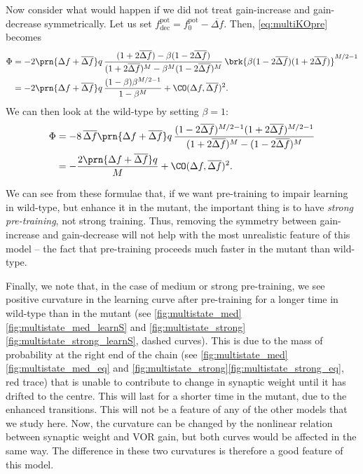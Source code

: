 \documentclass[12pt]{article}
\newcommand{\pot}{^{\text{pot}}}
\newcommand{\norm}{_0}
\newcommand{\dec}{_{\text{dec}}}
\begin{document}
Now consider what would happen if we did not treat gain-increase and gain-decrease symmetrically.
Let us set $f\pot\dec = f\pot\norm - \overline{\Delta f}$.
Then, \eqref{eq:multiKOpre} becomes
%
\begin{equation}\label{eq:multiKOdiffpre}
\begin{aligned}
  \Phi &= -2\prn{\Delta f + \overline{\Delta f}} q \, \frac{(1+2\overline{\Delta f}) - \beta(1-2\overline{\Delta f})}
          {(1+2\overline{\Delta f})^M - \beta^M(1-2\overline{\Delta f})^M}   \,
          \brk{\beta (1-2\overline{\Delta f}) (1+2\overline{\Delta f})}^{M/2-1} \\
       &= -2\prn{\Delta f + \overline{\Delta f}} q\,\frac{(1-\beta)\beta^{M/2-1}}{1-\beta^M} + \CO(\Delta f,\overline{\Delta f})^2.
\end{aligned}
\end{equation}
%
We can then look at the wild-type by setting $\beta=1$:
%
\begin{equation}\label{eq:multiWTdiffpre}
\begin{aligned}
  \Phi &= -8\,\overline{\Delta f}\prn{\Delta f + \overline{\Delta f}} q \,
          \frac{(1-2\overline{\Delta f})^{M/2-1} (1+2\overline{\Delta f})^{M/2-1} }
          {(1+2\overline{\Delta f})^M - (1-2\overline{\Delta f})^M}   \\
       &= -\frac{2\prn{\Delta f + \overline{\Delta f}} q}{M} + \CO(\Delta f,\overline{\Delta f})^2.
\end{aligned}
\end{equation}
%

We can see from these formulae that, if we want pre-training to impair learning in wild-type, but enhance it in the mutant, the important thing is to have \emph{strong pre-training}, not strong training.
Thus, removing the symmetry between gain-increase and gain-decrease will not help with the most unrealistic feature of this model -- the fact that pre-training proceeds much faster in the mutant than wild-type.

Finally, we note that, in the case of medium or strong pre-training, we see positive curvature in the learning curve after pre-training for a longer time in wild-type than in the mutant (see \autoref{fig:multistate_med}\ref{fig:multistate_med_learnS} and \autoref{fig:multistate_strong}\ref{fig:multistate_strong_learnS}, dashed curves).
This is due to the mass of probability at the right end of the chain (see \autoref{fig:multistate_med}\ref{fig:multistate_med_eq} and \autoref{fig:multistate_strong}\ref{fig:multistate_strong_eq}, red trace) that is unable to contribute to change in synaptic weight until it has drifted to the centre.
This will last for a shorter time in the mutant, due to the enhanced transitions.
This will not be a feature of any of the other models that we study here.
Now, the curvature can be changed by the nonlinear relation between synaptic weight and VOR gain, but both curves would be affected in the same way.
The difference in these two curvatures is therefore a good feature of this model.
\end{document}
